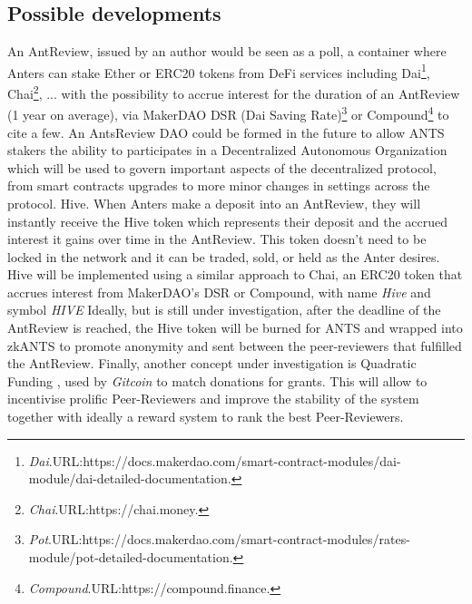 \documentclass[runningheads]{llncs}
\begin{document}
\subsection{Possible developments}
An AntReview, issued by an author would be seen as a poll, a container where Anters can stake Ether or ERC20 tokens from DeFi services including Dai\footnote[10]{\emph{Dai}.\textsc{URL:}https://docs.makerdao.com/smart-contract-modules/dai-module/dai-detailed-documentation.}, Chai\footnote[11]{\emph{Chai}.\textsc{URL:}https://chai.money.}, ... with the possibility to accrue interest for the duration of an AntReview (1 year on average), via MakerDAO DSR (Dai Saving Rate)\footnote[12]{\emph{Pot}.\textsc{URL:}https://docs.makerdao.com/smart-contract-modules/rates-module/pot-detailed-documentation.} or Compound\footnote[13]{\emph{Compound}.\textsc{URL:}https://compound.finance.} to cite a few.
 An AntsReview DAO could be formed in the future to allow ANTS stakers the ability to participates in a Decentralized Autonomous Organization which will be used to govern important aspects of the decentralized protocol, from smart contracts upgrades to more minor changes in settings across the protocol.
\newline Hive. When Anters make a deposit into an AntReview, they will instantly receive the Hive token which represents their deposit and the accrued interest it gains over time in the AntReview.
\newline This token doesn't need to be locked in the network and it can be traded, sold, or held as the Anter desires.
\newline Hive will be implemented using a similar approach to Chai, an ERC20 token that accrues interest from MakerDAO's DSR or Compound, with name \emph{Hive} and symbol \emph{HIVE}
\newline Ideally, but is still under investigation, after the deadline of the AntReview is reached, the Hive token will be burned for ANTS and wrapped into zkANTS to promote anonymity and sent between the peer-reviewers that fulfilled the AntReview.
\newline Finally, another concept under investigation is Quadratic Funding \cite{LiberalRadicalism}, used by \emph{Gitcoin} to match donations for grants. This will allow to incentivise prolific Peer-Reviewers and improve the stability of the system together with ideally a reward system to rank the best Peer-Reviewers.
\end{document}
